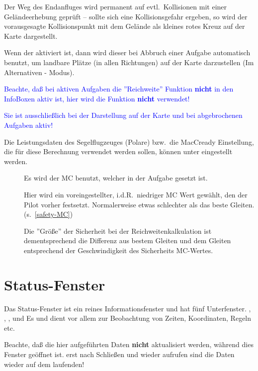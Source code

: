 Der Weg des Endanfluges wird permanent auf evtl.\ Kollisionen mit einer Geländeerhebung geprüft -- sollte sich eine Kollisionsgefahr ergeben, so wird der vorausgesagte Kollisionspunkt mit dem Gelände als kleines rotes Kreuz auf der Karte dargestellt.

Wenn der  aktiviert ist, dann wird dieser bei Abbruch einer Aufgabe  automatisch benutzt, um landbare Plätze (in allen Richtungen) auf der Karte darzustellen (Im Alternativen - Modus).


\textcolor{blue}{Beachte, daß bei aktiven Aufgaben die ''Reichweite'' Funktion   \textbf{nicht} in den InfoBoxen aktiv ist, hier wird die Funktion \textbf{nicht} verwendet!}\warning 


\textcolor{blue}{Sie ist ausschließlich bei der Darstellung auf der Karte und bei abgebrochenen Aufgaben aktiv!}

Die Leistungsdaten des Segelflugzeuges (Polare) bzw.\ die MacCready Einstellung, die für diese Berechnung verwendet werden sollen, können unter %
 eingestellt werden. 
\begin{description}
\item[] Es wird der MC benutzt, welcher in der Aufgabe gesetzt ist.
\item[] Hier wird ein voreingestellter, i.d.R.\ niedriger MC Wert gewählt, den der Pilot vorher festsetzt. Normalerweise etwas schlechter als das beste Gleiten. (s.~\ref{safety-MC}) 

Die ''Größe'' der Sicherheit bei der Reichweitenkalkulation ist dementsprechend   die Differenz aus bestem Gleiten und dem Gleiten entsprechend der Geschwindigkeit des Sicherheits MC-Wertes.
\end{description}
\section{Status-Fenster}\label{sec:aircr-stat-dial}

Das Status-Fenster ist ein reines Informationsfenster und hat fünf Unterfenster. , , ,  und  Es 
 und dient vor allem zur Beobachtung von Zeiten, Koordinaten, Regeln etc.\  
  
\achtung Beachte, daß die hier aufgeführten Daten \textbf{nicht} aktualisiert werden, während dies Fenster geöffnet ist. erst nach Schließen und wieder aufrufen sind die Daten wieder auf dem laufenden! 


